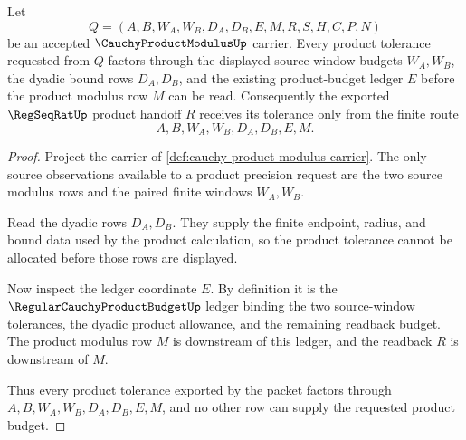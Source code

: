 \begin{theorem}
\label{thm:cauchy-product-modulus-window-budget}
Let
$$
Q=(A,B,W_A,W_B,D_A,D_B,E,M,R,S,H,C,P,N)
$$
be an accepted $\CauchyProductModulusUp$ carrier. Every product tolerance requested from $Q$ factors through the displayed source-window budgets $W_A,W_B$, the dyadic bound rows $D_A,D_B$, and the existing product-budget ledger $E$ before the product modulus row $M$ can be read. Consequently the exported $\RegSeqRatUp$ product handoff $R$ receives its tolerance only from the finite route
$$
A,B,W_A,W_B,D_A,D_B,E,M.
$$
\end{theorem}
\begin{proof}
Project the carrier of \autoref{def:cauchy-product-modulus-carrier}. The only source observations available to a product precision request are the two source modulus rows and the paired finite windows $W_A,W_B$.

Read the dyadic rows $D_A,D_B$. They supply the finite endpoint, radius, and bound data used by the product calculation, so the product tolerance cannot be allocated before those rows are displayed.

Now inspect the ledger coordinate $E$. By definition it is the $\RegularCauchyProductBudgetUp$ ledger binding the two source-window tolerances, the dyadic product allowance, and the remaining readback budget. The product modulus row $M$ is downstream of this ledger, and the readback $R$ is downstream of $M$.

Thus every product tolerance exported by the packet factors through $A,B,W_A,W_B,D_A,D_B,E,M$, and no other row can supply the requested product budget.
\end{proof}

